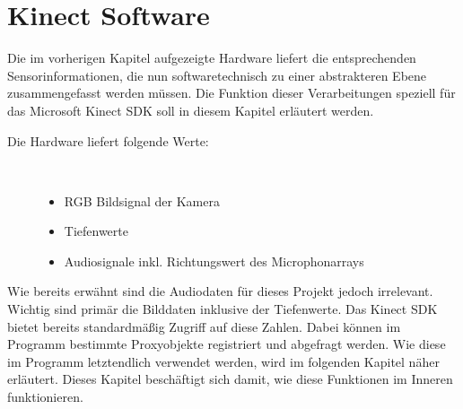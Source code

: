 \section{Kinect Software}\label{Software}



%
%
%		
%




Die im vorherigen Kapitel aufgezeigte Hardware liefert die entsprechenden Sensorinformationen, die nun
softwaretechnisch zu einer abstrakteren Ebene zusammengefasst werden müssen. Die Funktion dieser
Verarbeitungen speziell für das Microsoft Kinect SDK soll in diesem Kapitel erläutert werden.

\begin{description}
	\item[Die Hardware liefert folgende Werte:]~\par
	\begin{itemize}
		\item RGB Bildsignal der Kamera
		\item Tiefenwerte
		\item Audiosignale inkl. Richtungswert des Microphonarrays
	\end{itemize}
\end{description}

\noindent
Wie bereits erwähnt sind die Audiodaten für dieses Projekt jedoch irrelevant. Wichtig sind primär die Bilddaten inklusive der Tiefenwerte.
Das Kinect SDK bietet bereits standardmäßig Zugriff auf diese Zahlen. Dabei können im Programm bestimmte Proxyobjekte registriert und abgefragt werden. Wie diese im Programm letztendlich verwendet werden,
wird im folgenden Kapitel  näher erläutert. Dieses Kapitel beschäftigt sich
damit, wie diese Funktionen im Inneren funktionieren.

%
%
%
